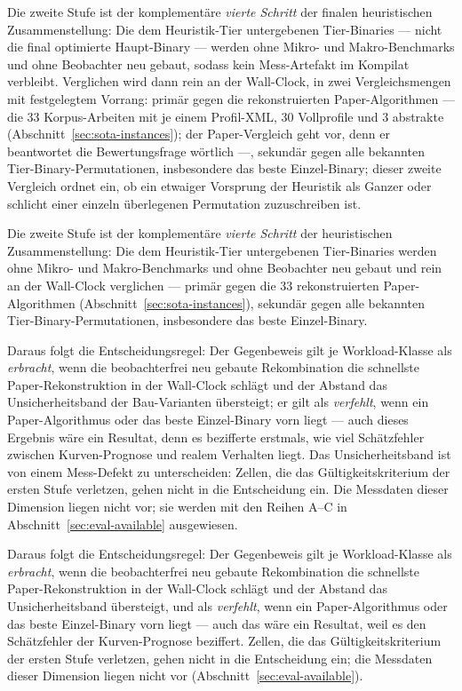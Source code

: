 \begin{nurlang}
Die zweite Stufe ist der komplementäre \emph{vierte Schritt} der finalen heuristischen
Zusammenstellung: Die dem Heuristik-Tier untergebenen Tier-Binaries --- nicht die final optimierte
Haupt-Binary --- werden ohne Mikro- und Makro-Benchmarks und ohne Beobachter neu gebaut, sodass kein
Mess-Artefakt im Kompilat verbleibt. Verglichen wird dann rein an der Wall-Clock, in zwei
Vergleichsmengen mit festgelegtem Vorrang: primär gegen die rekonstruierten Paper-Algorithmen --- die
33 Korpus-Arbeiten mit je einem Profil-XML, 30 Vollprofile und 3 abstrakte
(Abschnitt~\ref{sec:sota-instances}); der Paper-Vergleich geht vor, denn er beantwortet die
Bewertungsfrage wörtlich ---, sekundär gegen alle bekannten Tier-Binary-Permutationen, insbesondere
das beste Einzel-Binary; dieser zweite Vergleich ordnet ein, ob ein etwaiger Vorsprung der Heuristik
als Ganzer oder schlicht einer einzeln überlegenen Permutation zuzuschreiben ist.
\end{nurlang}
\begin{nurkurz}
Die zweite Stufe ist der komplementäre \emph{vierte Schritt} der heuristischen Zusammenstellung: Die dem
Heuristik-Tier untergebenen Tier-Binaries werden ohne Mikro- und Makro-Benchmarks und ohne Beobachter neu
gebaut und rein an der Wall-Clock verglichen --- primär gegen die 33 rekonstruierten Paper-Algorithmen
(Abschnitt~\ref{sec:sota-instances}), sekundär gegen alle bekannten Tier-Binary-Permutationen, insbesondere
das beste Einzel-Binary.
\end{nurkurz}

\begin{nurlang}
Daraus folgt die Entscheidungsregel: Der Gegenbeweis gilt je Workload-Klasse als \emph{erbracht},
wenn die beobachterfrei neu gebaute Rekombination die schnellste Paper-Rekonstruktion in der
Wall-Clock schlägt und der Abstand das Unsicherheitsband der Bau-Varianten übersteigt; er gilt als
\emph{verfehlt}, wenn ein Paper-Algorithmus oder das beste Einzel-Binary vorn liegt --- auch dieses
Ergebnis wäre ein Resultat, denn es bezifferte erstmals, wie viel Schätzfehler zwischen
Kurven-Prognose und realem Verhalten liegt. Das Unsicherheitsband ist von einem Mess-Defekt zu
unterscheiden: Zellen, die das Gültigkeitskriterium der ersten Stufe verletzen, gehen nicht in die
Entscheidung ein. Die Messdaten dieser Dimension liegen nicht vor; sie werden mit den Reihen A--C in
Abschnitt~\ref{sec:eval-available} ausgewiesen.
\end{nurlang}
\begin{nurkurz}
Daraus folgt die Entscheidungsregel: Der Gegenbeweis gilt je Workload-Klasse als \emph{erbracht}, wenn die
beobachterfrei neu gebaute Rekombination die schnellste Paper-Rekonstruktion in der Wall-Clock schlägt und
der Abstand das Unsicherheitsband übersteigt, und als \emph{verfehlt}, wenn ein Paper-Algorithmus oder das
beste Einzel-Binary vorn liegt --- auch das wäre ein Resultat, weil es den Schätzfehler der Kurven-Prognose
beziffert. Zellen, die das Gültigkeitskriterium der ersten Stufe
verletzen, gehen nicht in die Entscheidung ein; die Messdaten dieser Dimension liegen nicht vor
(Abschnitt~\ref{sec:eval-available}).
\end{nurkurz}

